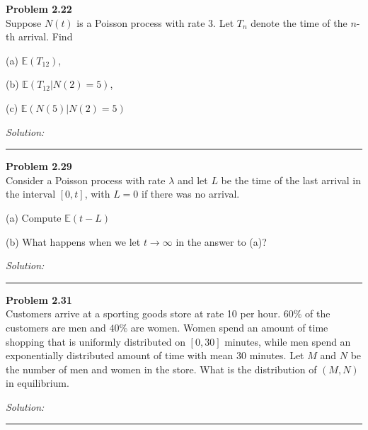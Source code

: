 \documentclass[a4paper, 11pt]{article}
\newenvironment{problem}[2][Problem]
    { \begin{mdframed}[backgroundcolor=gray!20] \textbf{#1 #2} \\}
    {  \end{mdframed}}
\newenvironment{solution}
    {\textit{Solution:}}
    {}
\begin{document}
\begin{problem}{2.22}
	Suppose $N(t)$ is a Poisson process with rate $3$. Let $T_n$ denote the time of
	the $n$-th arrival. Find 
	
	(a) $\mathbb{E}(T_{12})$, 
	
	(b) $\mathbb{E}(T_{12}|N(2) = 5)$, 
	
	(c) $\mathbb{E}(N(5)|N(2) = 5)$
\end{problem}
\begin{solution}
	
\end{solution} 

\noindent\rule{7in}{2.8pt}

\begin{problem}{2.29}
	Consider a Poisson process with rate $\lambda$ and let $L$ be the time of the last arrival in the interval $[0, t]$, with $L = 0$ if there was no arrival. 
	
	(a) Compute
	$\mathbb{E}(t - L)$ 
	
	(b) What happens when we let $t\rightarrow\infty$ in the answer to (a)?
\end{problem}
\begin{solution}
\end{solution} 

\noindent\rule{7in}{2.8pt}


\begin{problem}{2.31}
	Customers arrive at a sporting goods store at rate 10 per hour. $60\%$ of
	the customers are men and $40\%$ are women. Women spend an amount of time
	shopping that is uniformly distributed on $[0, 30]$ minutes, while men spend an
	exponentially distributed amount of time with mean $30$ minutes. Let $M$ and
	$N$ be the number of men and women in the store. What is the distribution of
	$(M, N)$ in equilibrium.
\end{problem}
\begin{solution}
\end{solution} 

\noindent\rule{7in}{2.8pt}

\end{document}
